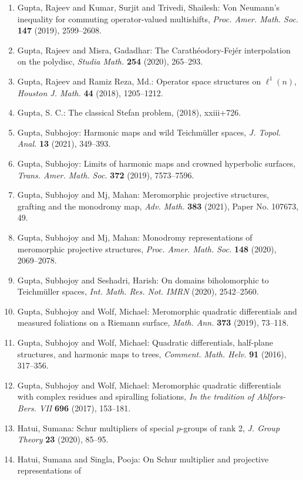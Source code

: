 \begin{enumerate}
\item Gupta, Rajeev and Kumar, Surjit and Trivedi, Shailesh: Von {N}eumann's inequality for commuting operator-valued
multishifts, \emph{Proc. Amer. Math. Soc.} {\bf 147} (2019), 2599--2608.
\item Gupta, Rajeev and Misra, Gadadhar: The {C}arath\'{e}odory-{F}ej\'{e}r interpolation on the polydisc, \emph{Studia Math.} {\bf 254} (2020), 265--293.
\item Gupta, Rajeev and Ramiz Reza, Md.: Operator space structures on {$\ell^1(n)$}, \emph{Houston J. Math.} {\bf 44} (2018), 1205--1212.
\item Gupta, S. C.: The classical {S}tefan problem, \emph{} {\bf } (2018), xxiii+726.
\item Gupta, Subhojoy: Harmonic maps and wild {T}eichm\"{u}ller spaces, \emph{J. Topol. Anal.} {\bf 13} (2021), 349--393.
\item Gupta, Subhojoy: Limits of harmonic maps and crowned hyperbolic surfaces, \emph{Trans. Amer. Math. Soc.} {\bf 372} (2019), 7573--7596.
\item Gupta, Subhojoy and Mj, Mahan: Meromorphic projective structures, grafting and the monodromy
map, \emph{Adv. Math.} {\bf 383} (2021), Paper No. 107673, 49.
\item Gupta, Subhojoy and Mj, Mahan: Monodromy representations of meromorphic projective
structures, \emph{Proc. Amer. Math. Soc.} {\bf 148} (2020), 2069--2078.
\item Gupta, Subhojoy and Seshadri, Harish: On domains biholomorphic to {T}eichm\"{u}ller spaces, \emph{Int. Math. Res. Not. IMRN} {\bf } (2020), 2542--2560.
\item Gupta, Subhojoy and Wolf, Michael: Meromorphic quadratic differentials and measured foliations on
a {R}iemann surface, \emph{Math. Ann.} {\bf 373} (2019), 73--118.
\item Gupta, Subhojoy and Wolf, Michael: Quadratic differentials, half-plane structures, and harmonic
maps to trees, \emph{Comment. Math. Helv.} {\bf 91} (2016), 317--356.
\item Gupta, Subhojoy and Wolf, Michael: Meromorphic quadratic differentials with complex residues and
spiralling foliations, \emph{In the tradition of {A}hlfors-{B}ers. {VII}} {\bf 696} (2017), 153--181.
\item Hatui, Sumana: Schur multipliers of special {$p$}-groups of rank 2, \emph{J. Group Theory} {\bf 23} (2020), 85--95.
\item Hatui, Sumana and Singla, Pooja: On {S}chur multiplier and projective representations of

\end{enumerate}
